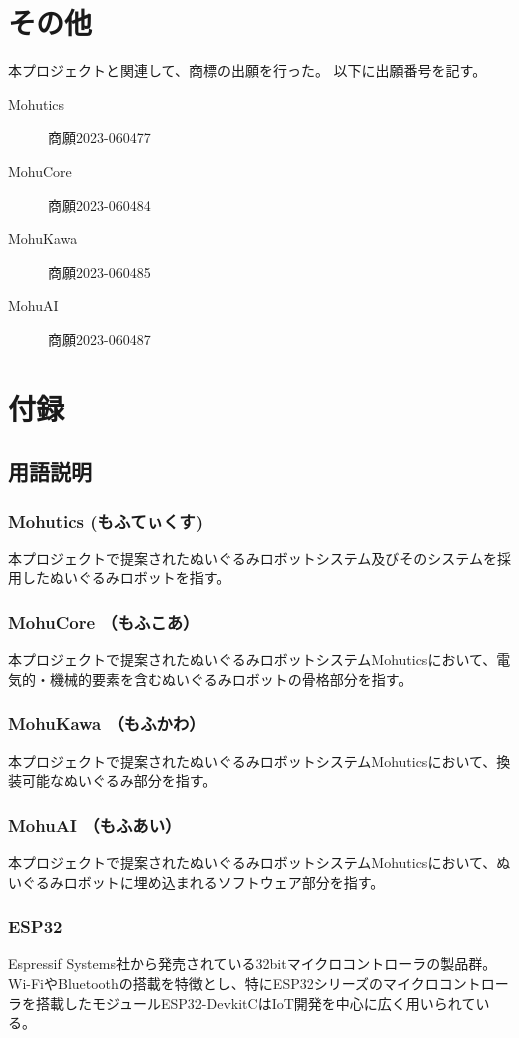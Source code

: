 \documentclass[uplatex,a4paper,12pt]{jsarticle}
\begin{document}
\section{その他}
本プロジェクトと関連して、商標の出願を行った。
以下に出願番号を記す。
\begin{description}
  \item[Mohutics] 商願2023-060477
  \item[MohuCore] 商願2023-060484
  \item[MohuKawa] 商願2023-060485
  \item[MohuAI] 商願2023-060487
\end{description}

\section{付録}

\subsection{用語説明}
\subsubsection*{Mohutics (もふてぃくす) \label{term:mohutics}}
本プロジェクトで提案されたぬいぐるみロボットシステム及びそのシステムを採用したぬいぐるみロボットを指す。

\subsubsection*{MohuCore （もふこあ）\label{term:mohucore}}
本プロジェクトで提案されたぬいぐるみロボットシステムMohuticsにおいて、電気的・機械的要素を含むぬいぐるみロボットの骨格部分を指す。
\subsubsection*{MohuKawa （もふかわ）\label{term:mohukawa}}
本プロジェクトで提案されたぬいぐるみロボットシステムMohuticsにおいて、換装可能なぬいぐるみ部分を指す。
\subsubsection*{MohuAI （もふあい）\label{term:mohuai}}
本プロジェクトで提案されたぬいぐるみロボットシステムMohuticsにおいて、ぬいぐるみロボットに埋め込まれるソフトウェア部分を指す。

\subsubsection*{ESP32 \label{term:esp32}}
Espressif Systems社から発売されている32bitマイクロコントローラの製品群。
Wi-FiやBluetoothの搭載を特徴とし、特にESP32シリーズのマイクロコントローラを搭載したモジュールESP32-DevkitCはIoT開発を中心に広く用いられている。
\end{document}
